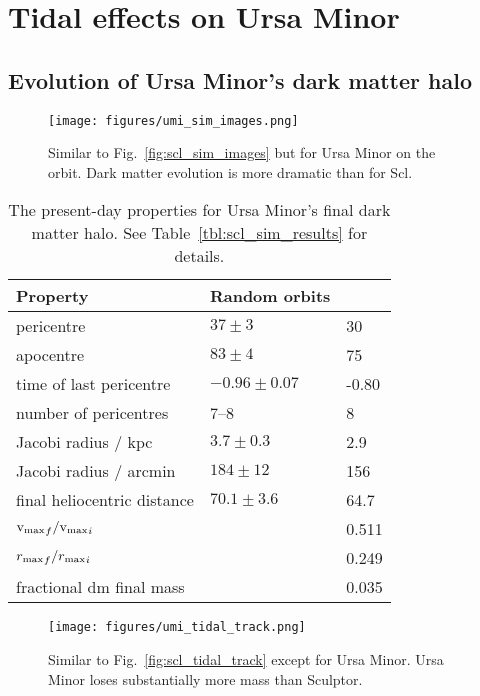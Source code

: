 \section{Tidal effects on Ursa Minor}\label{tidal-effects-on-ursa-minor}

\subsection{Evolution of Ursa Minor's dark matter
halo}\label{evolution-of-ursa-minors-dark-matter-halo}

\begin{figure}
\centering
\texttt{[image: figures/umi\_sim\_images.png]}
\caption[Ursa Minor simulation snapshots]{Similar to
Fig.~\ref{fig:scl_sim_images} but for Ursa Minor on the \smallperi{}
orbit. Dark matter evolution is more dramatic than for
Scl.}\label{fig:umi_sim_images}
\end{figure}

\begin{table*}[t]
\centering
\caption[Simulation results for Ursa Minor’s dark matter]{The present-day properties for Ursa Minor’s final dark matter halo. See Table \ref{tbl:scl_sim_results} for details. }
\label{tbl:umi_sim_results}
\begin{tabular}{lll}
\toprule
Property & Random orbits & \smallperi{}\\
\midrule
pericentre & $37\pm3$ & 30\\
apocentre & $83 \pm 4$ & 75\\
time of last pericentre & $-0.96 \pm 0.07$ & -0.80\\
number of pericentres & 7–8 & 8\\
Jacobi radius / kpc & $3.7 \pm 0.3$ & 2.9\\
Jacobi radius / arcmin & $184 \pm 12$ & 156\\
final heliocentric distance & $70.1 \pm 3.6$ & 64.7\\
${{\rm v}_{\rm max}}_f / {{\rm v}_{\rm max}}_i$ &  & 0.511\\
${r_{\rm max}}_f / {r_{\rm max}}_i$ &  & 0.249\\
fractional dm final mass &  & 0.035\\
\bottomrule
\end{tabular}
\end{table*}

\begin{figure}
\centering
\texttt{[image: figures/umi\_tidal\_track.png]}
\caption[Ursa Minor tidal tracks]{Similar to
Fig.~\ref{fig:scl_tidal_track} except for Ursa Minor. Ursa Minor loses
substantially more mass than Sculptor.}\label{fig:umi_tidal_track}
\end{figure}

